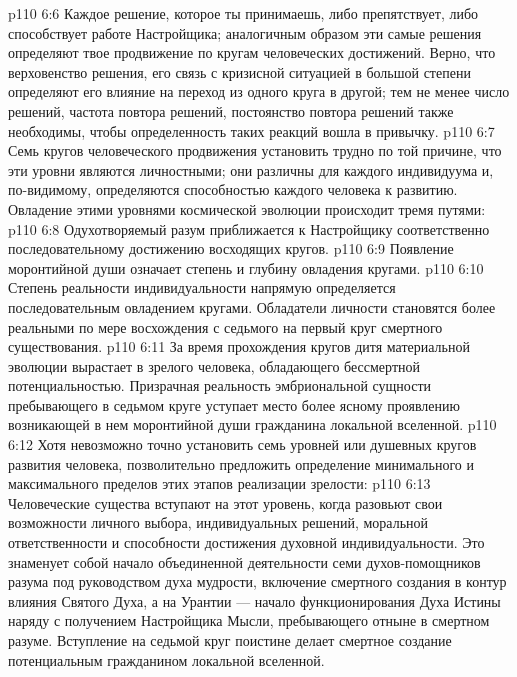 \vs p110 6:6 \pc Каждое решение, которое ты принимаешь, либо препятствует, либо способствует работе Настройщика; аналогичным образом эти самые решения определяют твое продвижение по кругам человеческих достижений. Верно, что верховенство решения, его связь с кризисной ситуацией в большой степени определяют его влияние на переход из одного круга в другой; тем не менее число решений, частота повтора решений, постоянство повтора решений также необходимы, чтобы определенность таких реакций вошла в привычку.
\vs p110 6:7 Семь кругов человеческого продвижения установить трудно по той причине, что эти уровни являются личностными; они различны для каждого индивидуума и, по\hyp{}видимому, определяются способностью каждого человека к развитию. Овладение этими уровнями космической эволюции происходит тремя путями:
\vs p110 6:8 \bibnobreakspace {} Одухотворяемый разум приближается к Настройщику соответственно последовательному достижению восходящих кругов.
\vs p110 6:9 \bibnobreakspace {} Появление моронтийной души означает степень и глубину овладения кругами.
\vs p110 6:10 \bibnobreakspace {} Степень реальности индивидуальности напрямую определяется последовательным овладением кругами. Обладатели личности становятся более реальными по мере восхождения с седьмого на первый круг смертного существования.
\vs p110 6:11 \pc За время прохождения кругов дитя материальной эволюции вырастает в зрелого человека, обладающего бессмертной потенциальностью. Призрачная реальность эмбриональной сущности пребывающего в седьмом круге уступает место более ясному проявлению возникающей в нем моронтийной души гражданина локальной вселенной.
\vs p110 6:12 Хотя невозможно точно установить семь уровней или душевных кругов развития человека, позволительно предложить определение минимального и максимального пределов этих этапов реализации зрелости:
\vs p110 6:13 \pc {} Человеческие существа вступают на этот уровень, когда разовьют свои возможности личного выбора, индивидуальных решений, моральной ответственности и способности достижения духовной индивидуальности. Это знаменует собой начало объединенной деятельности семи духов\hyp{}помощников разума под руководством духа мудрости, включение смертного создания в контур влияния Святого Духа, а на Урантии --- начало функционирования Духа Истины наряду с получением Настройщика Мысли, пребывающего отныне в смертном разуме. Вступление на седьмой круг поистине делает смертное создание потенциальным гражданином локальной вселенной.
